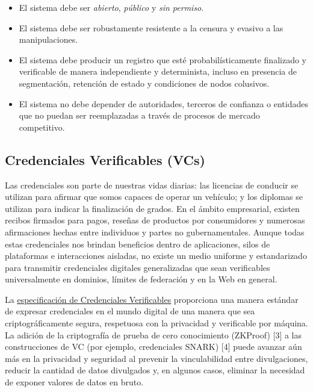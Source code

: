 \documentclass[11pt]{article}
\begin{document}
\begin{itemize}
	\item El sistema debe ser \textit{abierto}, \textit{público} y \textit{sin permiso}.

	\item El sistema debe ser robustamente resistente a la censura y evasivo a las manipulaciones.

	\item El sistema debe producir un registro que esté probabilísticamente finalizado y verificable de manera independiente y determinista, incluso en presencia de segmentación, retención de estado y condiciones de nodos colusivos.

	\item El sistema no debe depender de autoridades, terceros de confianza o entidades que no puedan ser reemplazadas a través de procesos de mercado competitivo.

\vspace{1\baselineskip}
\end{itemize}
\subsection{Credenciales Verificables (VCs)}

\vspace{1\baselineskip}
Las credenciales son parte de nuestras vidas diarias: las licencias de conducir se utilizan para afirmar que somos capaces de operar un vehículo; y los diplomas se utilizan para indicar la finalización de grados. En el ámbito empresarial, existen recibos firmados para pagos, reseñas de productos por consumidores y numerosas afirmaciones hechas entre individuos y partes no gubernamentales. Aunque todas estas credenciales nos brindan beneficios dentro de aplicaciones, silos de plataformas e interacciones aisladas, no existe un medio uniforme y estandarizado para transmitir credenciales digitales generalizadas que sean verificables universalmente en dominios, límites de federación y en la Web en general.

\vspace{1\baselineskip}
La \href{https://www.w3.org/TR/vc-data-model/}{\uline{\textcolor[HTML]{1155CC}{especificación de Credenciales Verificables}}} proporciona una manera estándar de expresar credenciales en el mundo digital de una manera que sea criptográficamente segura, respetuosa con la privacidad y verificable por máquina. La adición de la criptografía de prueba de cero conocimiento (ZKProof) [3] a las construcciones de VC (por ejemplo, credenciales SNARK) [4] puede avanzar aún más en la privacidad y seguridad al prevenir la vinculabilidad entre divulgaciones, reducir la cantidad de datos divulgados y, en algunos casos, eliminar la necesidad de exponer valores de datos en bruto.
\end{document}
